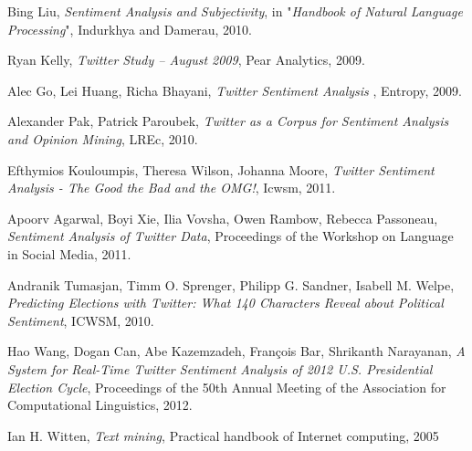 \begin{thebibliography}{99}

 Bing Liu,
{\em Sentiment Analysis and Subjectivity},
in "\textit{Handbook of Natural Language Processing}", Indurkhya and Damerau, 2010.

 Ryan Kelly,
{\em Twitter Study – August 2009},
Pear Analytics, 2009.
 
 Alec Go, Lei Huang, Richa Bhayani,
{\em Twitter Sentiment Analysis },
Entropy, 2009.

 Alexander Pak, Patrick Paroubek,
{\em Twitter as a Corpus for Sentiment Analysis and Opinion Mining},
LREc, 2010.

 Efthymios Kouloumpis, Theresa Wilson, Johanna Moore,
{\em Twitter Sentiment Analysis - The Good the Bad and the OMG!},
Icwsm, 2011. 

 Apoorv Agarwal, Boyi Xie, Ilia Vovsha, Owen Rambow, Rebecca Passoneau,
{\em Sentiment Analysis of Twitter Data},
Proceedings of the Workshop on Language in Social Media, 2011.

 Andranik Tumasjan, Timm O. Sprenger, Philipp G. Sandner, Isabell M. Welpe,
{\em Predicting Elections with Twitter: What 140 Characters Reveal about Political Sentiment},
ICWSM, 2010.

 Hao Wang, Dogan Can, Abe Kazemzadeh, François Bar,  Shrikanth Narayanan,
{\em A System for Real-Time Twitter Sentiment Analysis of 2012 U.S. Presidential Election Cycle},
Proceedings of the 50th Annual Meeting of the Association for Computational Linguistics, 2012.

 Ian H. Witten,
{\em Text mining},
Practical handbook of Internet computing, 2005
\end{thebibliography}